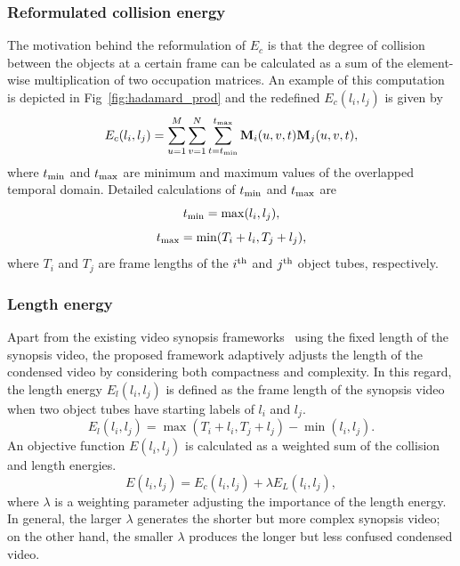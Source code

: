 \documentclass[11pt]{hyu_thesis}
\begin{document}
\subsubsection{Reformulated collision energy}
The motivation behind the reformulation of $E_c$ is that the degree of collision between the objects at a certain frame can be calculated as a sum of the element-wise multiplication of two occupation matrices. An example of this computation is depicted in Fig~\ref{fig:hadamard_prod} and the redefined $E_c(l_i,l_j)$ is given by
\begin{equation}
\label{eq:EcNew}
E_c(l_i,l_j) = \sum_{u=1}^{M}\sum_{v=1}^{N}\sum_{t=t_{\rm{min}}}^{t_{\rm{max}}} \textbf{M}_i(u,v,t)\textbf{M}_j(u,v,t),
\end{equation}
where $t_{\rm{min}}$ and $t_{\rm{max}}$ are minimum and maximum values of the overlapped temporal domain. Detailed calculations of $t_{\rm{min}}$ and $t_{\rm{max}}$ are
\begin{equation}
\label{eq:t_min}
t_{\rm{min}} = \max(l_i, l_j),
\end{equation}
\begin{equation}
\label{eq:t_max}
t_{\rm{max}} = \min(T_i + l_i, T_j + l_j),
\end{equation}
where $T_i$ and $T_j$ are frame lengths of the $i^{\rm{th}}$ and $j^{\rm{th}}$ object tubes, respectively.

\subsubsection{Length energy}
Apart from the existing video synopsis frameworks~\cite{} using the fixed length of the synopsis video, the proposed framework adaptively adjusts the length of the condensed video by considering both compactness and complexity. In this regard, the length energy $E_l (l_i,l_j)$ is defined as the frame length of the synopsis video when two object tubes have starting labels of $l_i$ and $l_j$.
\begin{equation}
\label{eq:El}
E_l(l_i, l_j) = \max(T_i + l_i, T_j + l_j) - \min(l_i, l_j).
\end{equation}
An objective function $E(l_i,l_j)$ is calculated as a weighted sum of the collision and length energies.
\begin{equation}
\label{eq:obj_func}
E(l_i, l_j) = E_c(l_i, l_j) + \lambda E_L(l_i, l_j),
\end{equation}
where $\lambda$ is a weighting parameter adjusting the importance of the length energy. In general, the larger $\lambda$ generates the shorter but more complex synopsis video; on the other hand, the smaller $\lambda$ produces the longer but less confused condensed video.
\end{document}

